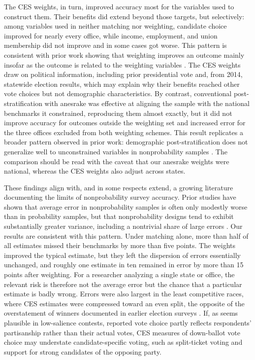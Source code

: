 \documentclass[12pt]{article}
\begin{document}
The CES weights, in turn, improved accuracy most for the variables used to construct them. Their benefits did extend beyond those targets, but selectively: among variables used in neither matching nor weighting, candidate choice improved for nearly every office, while income, employment, and union membership did not improve and in some cases got worse. This pattern is consistent with prior work showing that weighting improves an outcome mainly insofar as the outcome is related to the weighting variables \parencite{mercer_for_2018}. The CES weights draw on political information, including prior presidential vote and, from 2014, statewide election results, which may explain why their benefits reached other vote choices but not demographic characteristics. By contrast, conventional post-stratification with anesrake was effective at aligning the sample with the national benchmarks it constrained, reproducing them almost exactly, but it did not improve accuracy for outcomes outside the weighting set and increased error for the three offices excluded from both weighting schemes. This result replicates a broader pattern observed in prior work: demographic post-stratification does not generalize well to unconstrained variables in nonprobability samples \parencite{yeager_comparing_2011, macinnis_accuracy_2018, dutwin_apples_2017}. The comparison should be read with the caveat that our anesrake weights were national, whereas the CES weights also adjust across states.

These findings align with, and in some respects extend, a growing literature documenting the limits of nonprobability survey accuracy. Prior studies have shown that average error in nonprobability samples is often only modestly worse than in probability samples, but that nonprobability designs tend to exhibit substantially greater variance, including a nontrivial share of large errors \parencite{yeager_comparing_2011, chang_national_2009, macinnis_accuracy_2018, cornesse_review_2020}. Our results are consistent with this pattern. Under matching alone, more than half of all estimates missed their benchmarks by more than five points. The weights improved the typical estimate, but they left the dispersion of errors essentially unchanged, and roughly one estimate in ten remained in error by more than 15 points after weighting. For a researcher analyzing a single state or office, the relevant risk is therefore not the average error but the chance that a particular estimate is badly wrong. Errors were also largest in the least competitive races, where CES estimates were compressed toward an even split, the opposite of the overstatement of winners documented in earlier election surveys \parencite{wright1993errors, mattei1998winning}. If, as seems plausible in low-salience contests, reported vote choice partly reflects respondents' partisanship rather than their actual votes, CES measures of down-ballot vote choice may understate candidate-specific voting, such as split-ticket voting and support for strong candidates of the opposing party.
\end{document}
